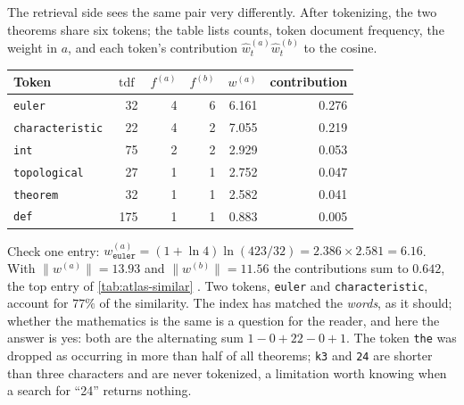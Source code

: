 \begin{example}\label{ex:atlas:cos}
The retrieval side sees the same pair very differently. After tokenizing, the two
theorems share six tokens; the table lists counts, token document frequency, the weight
in $a$, and each token's contribution $\hat w^{(a)}_t\hat w^{(b)}_t$ to the cosine.
\begin{center}\small
\begin{tabular}{@{}lrrrrr@{}}\toprule
Token & $\operatorname{tdf}$ & $f^{(a)}$ & $f^{(b)}$ & $w^{(a)}$ & contribution \\ \midrule
\texttt{euler} & 32 & 4 & 6 & 6.161 & 0.276 \\
\texttt{characteristic} & 22 & 4 & 2 & 7.055 & 0.219 \\
\texttt{int} & 75 & 2 & 2 & 2.929 & 0.053 \\
\texttt{topological} & 27 & 1 & 1 & 2.752 & 0.047 \\
\texttt{theorem} & 32 & 1 & 1 & 2.582 & 0.041 \\
\texttt{def} & 175 & 1 & 1 & 0.883 & 0.005 \\
\bottomrule\end{tabular}
\end{center}
Check one entry: $w^{(a)}_{\texttt{euler}}=(1+\ln4)\ln(423/32)=2.386\times2.581=6.16$.
With $\|w^{(a)}\|=13.93$ and $\|w^{(b)}\|=11.56$ the contributions sum to $0.642$, the
top entry of \cref{tab:atlas-similar} . Two tokens,
\texttt{euler} and \texttt{characteristic}, account for $77\%$ of the similarity. The
index has matched the \emph{words}, as it should; whether the mathematics is the same is
a question for the reader, and here the answer is yes: both are the alternating sum
$1-0+22-0+1$. The token \texttt{the} was dropped as occurring in more than half of all
theorems; \texttt{k3} and \texttt{24} are shorter than three characters and are never
tokenized, a limitation worth knowing when a search for ``24'' returns nothing.
\end{example}

